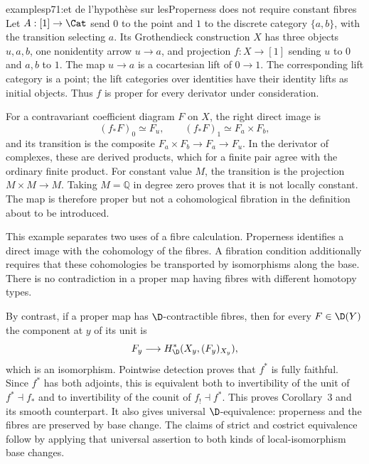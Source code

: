 \begin{dcomment}{examples}{p71:et de l'hypothèse sur les}{Properness does not require constant fibres}
Let $A:[1]\to\Cat$ send $0$ to the point and $1$ to the discrete category $\{a,b\}$, with the transition selecting $a$. Its Grothendieck construction $X$ has three objects $u,a,b$, one nonidentity arrow $u\to a$, and projection $f:X\to[1]$ sending $u$ to $0$ and $a,b$ to $1$. The map $u\to a$ is a cocartesian lift of $0\to1$. The corresponding lift category is a point; the lift categories over identities have their identity lifts as initial objects. Thus $f$ is proper for every derivator under consideration.

For a contravariant coefficient diagram $F$ on $X$, the right direct image is
\[
 (f_*F)_0\simeq F_u,\qquad
 (f_*F)_1\simeq F_a\times F_b,
\]
and its transition is the composite $F_a\times F_b\to F_a\to F_u$. In the derivator of complexes, these are derived products, which for a finite pair agree with the ordinary finite product. For constant value $M$, the transition is the projection $M\times M\to M$. Taking $M=\mathbb Q$ in degree zero proves that it is not locally constant. The map is therefore proper but not a cohomological fibration in the definition about to be introduced.

This example separates two uses of a fibre calculation. Properness identifies a direct image with the cohomology of the fibres. A fibration condition additionally requires that these cohomologies be transported by isomorphisms along the base. There is no contradiction in a proper map having fibres with different homotopy types.

By contrast, if a proper map has $\D$-contractible fibres, then for every $F\in\D(Y)$ the component at $y$ of its unit is
\[
 F_y\longrightarrow H^*_{\D}(X_y,(F_y)_{X_y}),
\]
which is an isomorphism. Pointwise detection proves that $f^*$ is fully faithful. Since $f^*$ has both adjoints, this is equivalent both to invertibility of the unit of $f^*\dashv f_*$ and to invertibility of the counit of $f_!\dashv f^*$. This proves Corollary~3 and its smooth counterpart. It also gives universal $\D$-equivalence: properness and the fibres are preserved by base change. The claims of strict and costrict equivalence follow by applying that universal assertion to both kinds of local-isomorphism base changes.
\end{dcomment}

